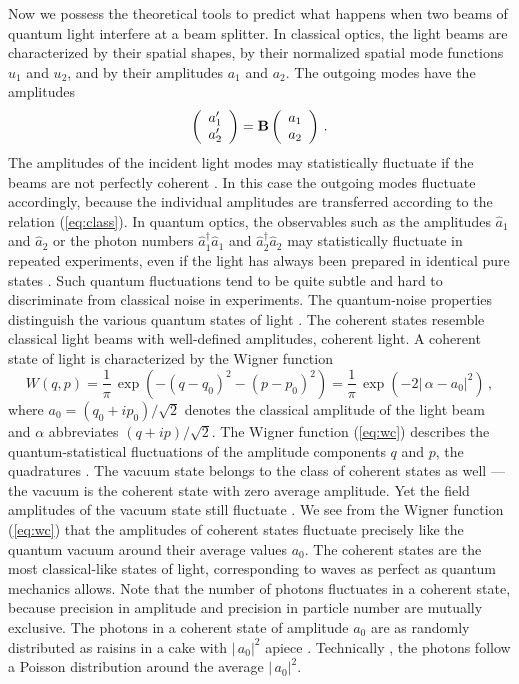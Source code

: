 \documentclass[12pt,amsmath,amssymb]{article}
\def\underline#1{{\bf #1}}
\numberwithin{equation}{section}
\begin{document}
Now we possess the theoretical tools to predict what happens
when two beams of quantum light interfere at a beam splitter. In
classical optics, the light beams are characterized by their
spatial shapes, by their normalized spatial mode functions $u_1$
and $u_2$, and by their amplitudes $a_1$ and $a_2$. The outgoing
modes have the amplitudes
\begin{equation}
\label{eq:class} \left(
    \begin{array}{c}
     a_1'  \\
     a_2'
    \end{array}
\right) = \underline{B} \left(
    \begin{array}{c}
     a_1  \\
     a_2
    \end{array}
\right)\,.
\end{equation}
The amplitudes of the incident light modes may statistically
fluctuate if the beams are not perfectly coherent
\cite{BornWolf,MandelWolf}. In this case the outgoing modes
fluctuate accordingly, because the individual amplitudes are
transferred according to the relation (\ref{eq:class}). In
quantum optics, the observables such as the amplitudes
$\hat{a}_1$ and $\hat{a}_2$ or the photon numbers
$\hat{a}_1^\dagger\hat{a}_1$ and $\hat{a}_2^\dagger\hat{a}_2$ may
statistically fluctuate in repeated experiments, even if the
light has always been prepared in identical pure states
\cite{Leonhardt}. Such quantum fluctuations tend to be quite
subtle and hard to discriminate from classical noise in
experiments. The quantum-noise properties distinguish the various
quantum states of light \cite{Leonhardt}. The coherent states
\cite{Leonhardt} resemble classical light beams with well-defined
amplitudes, coherent light. A coherent state of light is
characterized by the Wigner function \cite{Leonhardt}
\begin{equation}
\label{eq:wc} W(q,p) =
\frac{1}{\pi}\,\exp\left(-(q-q_0)^2-(p-p_0)^2\right) =
\frac{1}{\pi}\,\exp\left(-2|\,\alpha-a_0|^2\right) \,,
\end{equation}
where $a_0=(q_0+ip_0)/\sqrt{2}$ denotes the classical amplitude
of the light beam and $\alpha$ abbreviates $(q+ip)/\sqrt{2}$. The
Wigner function (\ref{eq:wc}) describes the quantum-statistical
fluctuations of the amplitude components $q$ and $p$, the
quadratures \cite{Leonhardt}. The vacuum state belongs to the
class of coherent states as well \cite{Leonhardt} --- the vacuum
is the coherent state with zero average amplitude. Yet the field
amplitudes of the vacuum state still fluctuate \cite{Leonhardt}.
We see from the Wigner function (\ref{eq:wc}) that the amplitudes
of coherent states fluctuate precisely like the quantum vacuum
around their average values $a_0$. The coherent states are the
most classical-like states of light, corresponding to waves as
perfect as quantum mechanics allows. Note that the number of
photons fluctuates in a coherent state, because precision in
amplitude and precision in particle number are mutually
exclusive. The photons in a coherent state of amplitude $a_0$ are
as randomly distributed as raisins in a cake with $|\,a_0|^2$
apiece \cite{Leonhardt}. Technically \cite{Leonhardt}, the photons
follow a Poisson distribution around the average $|\,a_0|^2$.
\end{document}
